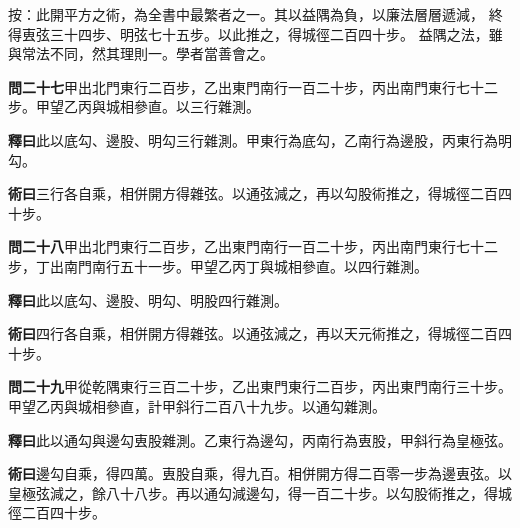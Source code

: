 \documentclass[12pt,a4paper]{article}
\begin{document}
\vspace{0.5em}

\noindent
按：此開平方之術，為全書中最繁者之一。其以益隅為負，以廉法層層遞減，
終得叀弦三十四步、明弦七十五步。以此推之，得城徑二百四十步。
益隅之法，雖與常法不同，然其理則一。學者當善會之。

\vspace{0.5em}

\noindent\textbf{問二十七}\quad 甲出北門東行二百步，乙出東門南行一百二十步，丙出南門東行七十二步。甲望乙丙與城相參直。以三行雜測。

\vspace{0.3em}

\noindent\textbf{釋曰}\quad 此以底勾、邊股、明勾三行雜測。甲東行為底勾，乙南行為邊股，丙東行為明勾。

\vspace{0.3em}

\noindent\textbf{術曰}\quad 三行各自乘，相併開方得雜弦。以通弦減之，再以勾股術推之，得城徑二百四十步。

\vspace{0.5em}

\noindent\textbf{問二十八}\quad 甲出北門東行二百步，乙出東門南行一百二十步，丙出南門東行七十二步，丁出南門南行五十一步。甲望乙丙丁與城相參直。以四行雜測。

\vspace{0.3em}

\noindent\textbf{釋曰}\quad 此以底勾、邊股、明勾、明股四行雜測。

\vspace{0.3em}

\noindent\textbf{術曰}\quad 四行各自乘，相併開方得雜弦。以通弦減之，再以天元術推之，得城徑二百四十步。

\vspace{0.5em}

\noindent\textbf{問二十九}\quad 甲從乾隅東行三百二十步，乙出東門東行二百步，丙出東門南行三十步。甲望乙丙與城相參直，計甲斜行二百八十九步。以通勾雜測。

\vspace{0.3em}

\noindent\textbf{釋曰}\quad 此以通勾與邊勾叀股雜測。乙東行為邊勾，丙南行為叀股，甲斜行為皇極弦。

\vspace{0.3em}

\noindent\textbf{術曰}\quad 邊勾自乘，得四萬。叀股自乘，得九百。相併開方得二百零一步為邊叀弦。以皇極弦減之，餘八十八步。再以通勾減邊勾，得一百二十步。以勾股術推之，得城徑二百四十步。
\end{document}
